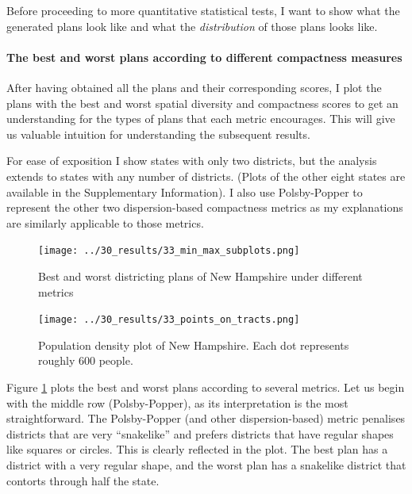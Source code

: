 \documentclass[]{article}
\let\oldparagraph\paragraph
\renewcommand{\paragraph}[1]{\oldparagraph{#1}\mbox{}}
\begin{document}
Before proceeding to more quantitative statistical tests, I want to show
what the generated plans look like and what the \emph{distribution} of
those plans looks like.

\hypertarget{the-best-and-worst-plans-according-to-different-compactness-measures}{%
\paragraph{The best and worst plans according to different compactness
measures}\label{the-best-and-worst-plans-according-to-different-compactness-measures}}

After having obtained all the plans and their corresponding scores, I
plot the plans with the best and worst spatial diversity and compactness
scores to get an understanding for the types of plans that each metric
encourages. This will give us valuable intuition for understanding the
subsequent results.

For ease of exposition I show states with only two districts, but the
analysis extends to states with any number of districts. (Plots of the
other eight states are available in the Supplementary Information). I
also use Polsby-Popper to represent the other two dispersion-based
compactness metrics as my explanations are similarly applicable to those
metrics.

\begin{figure}
\centering
\texttt{[image: ../30\_results/33\_min\_max\_subplots.png]}
\caption{Best and worst districting plans of New Hampshire under
different metrics \label{nh_minmax}}
\end{figure}

\begin{figure}
\centering
\texttt{[image: ../30\_results/33\_points\_on\_tracts.png]}
\caption{Population density plot of New Hampshire. Each dot represents
roughly 600 people. \label{nh_density}}
\end{figure}

Figure \ref{nh_minmax} plots the best and worst plans according to
several metrics. Let us begin with the middle row (Polsby-Popper), as
its interpretation is the most straightforward. The Polsby-Popper (and
other dispersion-based) metric penalises districts that are very
``snakelike'' and prefers districts that have regular shapes like
squares or circles. This is clearly reflected in the plot. The best plan
has a district with a very regular shape, and the worst plan has a
snakelike district that contorts through half the state.
\end{document}
